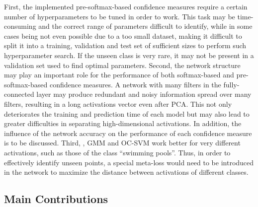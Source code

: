 \documentclass[10pt]{article}
\begin{document}
 First, the implemented pre-softmax-based confidence measures require a certain number of hyperparameters to be tuned in order to work. This task may be time-consuming and the correct range of parameters difficult to identify, while in some cases being not even possible due to a too small dataset, making it difficult to split it into a training, validation and test set of sufficient sizes to perform such hyperparameter search. If the unseen class is very rare, it may not be present in a validation set used to find optimal parameters. Second, the network structure may play an important role for the performance of both softmax-based and pre-softmax-based confidence measures. A network with many filters in the fully-connected layer may produce redundant and noisy information spread over many filters, resulting in a long activations vector even after \gls{PCA}. This not only deteriorates the training and prediction time of each model but may also lead to greater difficulties in separating high-dimensional activations. In addition, the influence of the network accuracy on the performance of each confidence measure is to be discussed. Third, , \gls{GMM} and \gls{OC-SVM} work better for very different activations, such as those of the class ``swimming pools''. Thus, in order to effectively identify unseen points, a special meta-loss would need to be introduced in the network to maximize the distance between activations of different classes.

\subsection{Main Contributions}
\end{document}
